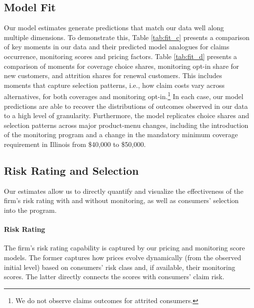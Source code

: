 \subsection{Model Fit}

Our model estimates generate predictions that match our data well along multiple dimensions. To demonstrate this, Table \ref{tab:fit_c} presents a comparison of key moments in our data and their predicted model analogues for claims occurrence, monitoring scores and pricing factors. Table \ref{tab:fit_d} presents a comparison of moments for coverage choice shares, monitoring opt-in share for new customers, and attrition shares for renewal customers. This includes moments that capture selection patterns, i.e., how claim costs vary across alternatives, for both coverages and monitoring opt-in.\footnote{We do not observe claims outcomes for attrited consumers.} In each case, our model predictions are able to recover the distributions of outcomes observed in our data to a high level of granularity.
Furthermore, the model replicates choice shares and selection patterns across major product-menu changes, including the introduction of the monitoring program and a change in the mandatory minimum coverage requirement in Illinois from \$40,000 to \$50,000.

\subsection{Risk Rating and Selection}

Our estimates allow us to directly quantify and visualize the effectiveness of the firm's risk rating with and without monitoring, as well as consumers' selection into the program.

\clearpage
\enlargethispage{3em}
\begingroup
\let\oldtable\table
\def\table[#1]{\oldtable[H]}
\vspace{-2em}
\endgroup
\clearpage

\paragraph{Risk Rating}

The firm's risk rating capability is captured by our pricing and monitoring score models. The former captures how prices evolve dynamically (from the observed initial level) based on consumers' risk class and, if available, their monitoring scores. The latter directly connects the scores with consumers' claim risk.

